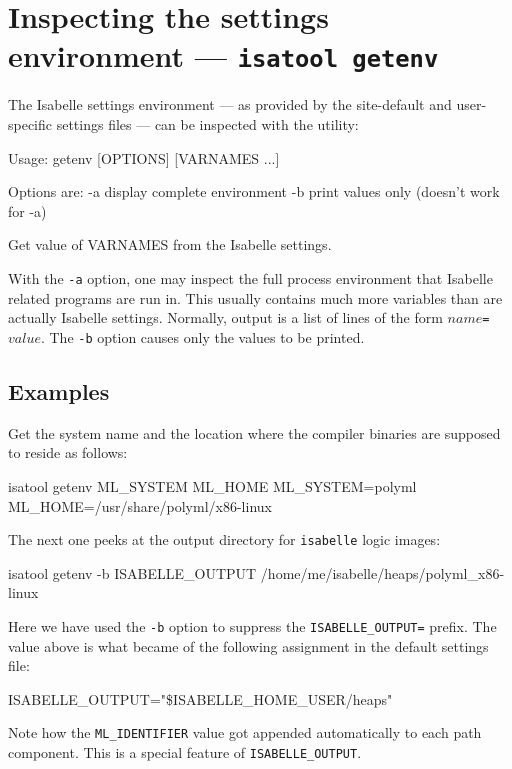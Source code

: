 \section{Inspecting the settings environment --- \texttt{isatool getenv}}
\label{sec:tool-getenv}

The Isabelle settings environment --- as provided by the site-default and
user-specific settings files --- can be inspected with the 
utility:
\begin{ttbox}
Usage: getenv [OPTIONS] [VARNAMES ...]

  Options are:
    -a           display complete environment
    -b           print values only (doesn't work for -a)

  Get value of VARNAMES from the Isabelle settings.
\end{ttbox}

With the \texttt{-a} option, one may inspect the full process environment that
Isabelle related programs are run in. This usually contains much more
variables than are actually Isabelle settings.  Normally, output is a list of
lines of the form \mbox{$name$\texttt{=}$value$}. The \texttt{-b} option
causes only the values to be printed.


\subsection*{Examples}

Get the {\ML} system name and the location where the compiler binaries are
supposed to reside as follows:
\begin{ttbox}
isatool getenv ML_SYSTEM ML_HOME
{\out ML_SYSTEM=polyml}
{\out ML_HOME=/usr/share/polyml/x86-linux}
\end{ttbox}

The next one peeks at the output directory for \texttt{isabelle} logic images:
\begin{ttbox}
isatool getenv -b ISABELLE_OUTPUT
{\out /home/me/isabelle/heaps/polyml_x86-linux}
\end{ttbox}
Here we have used the \texttt{-b} option to suppress the
\texttt{ISABELLE_OUTPUT=} prefix.  The value above is what became of the
following assignment in the default settings file:
\begin{ttbox}
ISABELLE_OUTPUT="\$ISABELLE_HOME_USER/heaps"
\end{ttbox}
Note how the \texttt{ML_IDENTIFIER} value got appended automatically to each
path component. This is a special feature of \texttt{ISABELLE_OUTPUT}.



